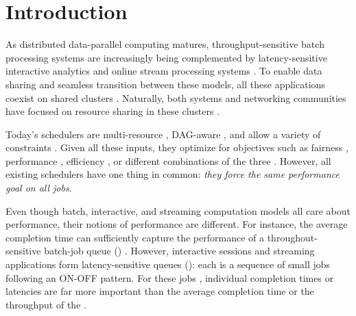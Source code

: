 \section{Introduction}

As distributed data-parallel computing matures, throughput-sensitive batch processing systems \cite{mapreduce, dryad, graphlab, tez} are increasingly being complemented by latency-sensitive interactive analytics \cite{spark, blinkdb, presto} and online stream processing systems \cite{spark-streaming, trident, millwheel, naiad, flink}. 
To enable data sharing and seamless transition between these models, all these applications coexist on shared clusters \cite{google-dataflow-cloud, databricks-cloud, bdas, mesos, yarn, kubernetes, dc-computer}.
Naturally, both systems and networking communities have focused on resource sharing in these clusters \cite{mesos, yarn, apollo, hadoop-capacity-scheduler, varys, oktopus}. 

Today's schedulers are multi-resource \cite{drf, tetris, multiresource-mungchiang, orchestra, pacman}, DAG-aware \cite{aalo, tetris, spark}, and allow a variety of constraints \cite{late, quincy, mantri, choosy, delay-scheduling}. 
Given all these inputs, they optimize for objectives such as fairness \cite{drf, jaffe-maxmin, drfq, hdrf}, performance \cite{sjf}, efficiency \cite{tetris}, or different combinations of the three \cite{carbyne, graphene}.
However, all existing schedulers have one thing in common: \emph{they force the same performance goal on all jobs}.

Even though batch, interactive, and streaming computation models all care about performance, their notions of performance are different.
For instance, the average completion time can sufficiently capture the performance of a throughout-sensitive batch-job queue (\batchq) \cite{tetris, carbyne, mantri, late}.
However, interactive sessions and streaming applications form latency-sensitive queues (\burstq): each \burstq is a sequence of small jobs following an ON-OFF pattern. 
For these jobs \cite{spark-streaming, spark, splunk-analysis, presto}, individual completion times or latencies are far more important than the average completion time or the throughput of the \burstq. 


